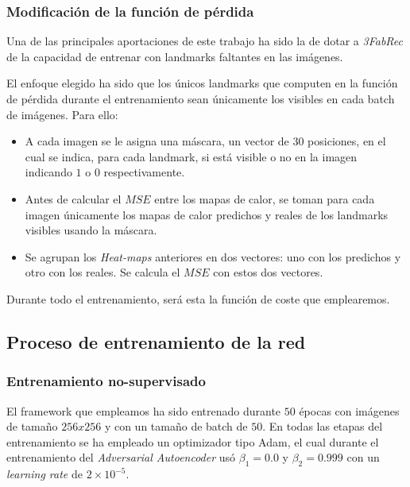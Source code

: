             \subsubsection{Modificación de la función de pérdida}

            \noindent Una de las principales aportaciones de este trabajo ha sido la de dotar a \textit{3FabRec} de la capacidad de entrenar con landmarks faltantes en las imágenes. 
            
            \medskip
            
            \noindent El enfoque elegido ha sido que los únicos landmarks que computen en la función de pérdida durante el entrenamiento sean únicamente los visibles en cada batch de imágenes. Para ello: 

            \begin{itemize}
                \item A cada imagen se le asigna una máscara, un vector de $30$ posiciones, en el cual se indica, para cada landmark, si está visible o no en la imagen indicando $1$ o $0$ respectivamente. 
                \item Antes de calcular el $MSE$ entre los mapas de calor, se toman para cada imagen únicamente los mapas de calor predichos y reales de los landmarks visibles usando la máscara.
                \item Se agrupan los \textit{Heat-maps} anteriores en dos vectores: uno con los predichos y otro con los reales. Se calcula el $MSE$ con estos dos vectores.
            \end{itemize}
            
            \medskip

            \noindent Durante todo el entrenamiento, será esta la función de coste que emplearemos.
        \subsection{Proceso de entrenamiento de la red}

            \subsubsection{Entrenamiento no-supervisado}
                \noindent El framework que empleamos ha sido entrenado durante $50$ épocas con imágenes de tamaño $256x256$ y con un tamaño de batch de $50$. En todas las etapas del entrenamiento se ha empleado un optimizador tipo Adam, el cual durante el entrenamiento del \textit{Adversarial Autoencoder} usó $\beta_1=0.0$ y $\beta_2=0.999$ con un \textit{learning rate} de $2\times 10^{-5}$.

